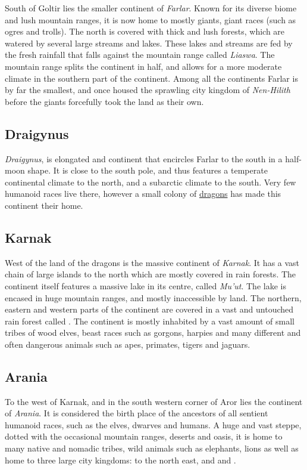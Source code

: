 South of Goltir lies the smaller continent of \emph{Farlar}. Known for its
diverse biome and lush mountain ranges, it is now home to mostly giants, giant
races (such as ogres and trolls). The north is covered with thick and lush
forests, which are watered by several large streams and lakes. These lakes
and streams are fed by the fresh rainfall that falls against the mountain range
called \emph{Liaswa}. The mountain range splits the continent in half, and
allows for a more moderate climate in the southern part of the continent. Among
all the continents Farlar is by far the smallest, and once housed the sprawling
city kingdom of \emph{Nen-Hilith} before the giants forcefully took the land as
their own.

\subsection{Draigynus}
\label{sec:Draigynus}

\emph{Draigynus}, is elongated and continent that encircles Farlar to the
south in a half-moon shape. It is close to the south pole, and thus features a
temperate continental climate to the north, and a subarctic climate to the
south. Very few humanoid races live there, however a small colony of
\hyperref[sec:Dragons]{dragons} has made this continent their home.

\subsection{Karnak}
\label{sec:Karnak}

West of the land of the dragons is the massive continent of \emph{Karnak}. It
has a vast chain of large islands to the north which are mostly covered in
rain forests. The continent itself features a massive lake in its centre,
called \emph{Mu'ut}. The lake is encased in huge mountain ranges, and mostly
inaccessible by land. The northern, eastern and western parts of the continent
are covered in a vast and untouched rain forest called .
The continent is mostly inhabited by a vast amount of small tribes of wood
elves, beast races such as gorgons, harpies and many different and often
dangerous animals such as apes, primates, tigers and jaguars.

\subsection{Arania}
\label{sec:Arania}

To the west of Karnak, and in the south western corner of Aror lies the
continent of \emph{Arania}. It is considered the birth place of the ancestors
of all sentient humanoid races, such as the elves, dwarves and humans. A huge
and vast steppe, dotted with the occasional mountain ranges, deserts and oasis,
it is home to many native and nomadic tribes, wild animals such as elephants,
lions as well as home to three large city kingdoms:  to the north east, and  and
.


